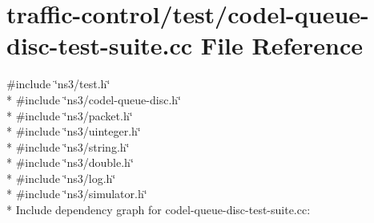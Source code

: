\hypertarget{codel-queue-disc-test-suite_8cc}{}\section{traffic-\/control/test/codel-\/queue-\/disc-\/test-\/suite.cc File Reference}
\label{codel-queue-disc-test-suite_8cc}
{\ttfamily \#include \char`\"{}ns3/test.\+h\char`\"{}}\\*
{\ttfamily \#include \char`\"{}ns3/codel-\/queue-\/disc.\+h\char`\"{}}\\*
{\ttfamily \#include \char`\"{}ns3/packet.\+h\char`\"{}}\\*
{\ttfamily \#include \char`\"{}ns3/uinteger.\+h\char`\"{}}\\*
{\ttfamily \#include \char`\"{}ns3/string.\+h\char`\"{}}\\*
{\ttfamily \#include \char`\"{}ns3/double.\+h\char`\"{}}\\*
{\ttfamily \#include \char`\"{}ns3/log.\+h\char`\"{}}\\*
{\ttfamily \#include \char`\"{}ns3/simulator.\+h\char`\"{}}\\*
Include dependency graph for codel-\/queue-\/disc-\/test-\/suite.cc\+:
